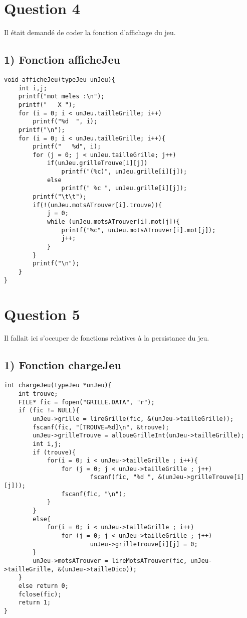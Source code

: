 \documentclass[a4paper,11pt]{article}
\begin{document}
\section*{Question 4}

Il était demandé de coder la fonction d'affichage du jeu.

\subsection*{1) Fonction afficheJeu}
\begin{lstlisting}[caption=La fonction afficheJeu]
void afficheJeu(typeJeu unJeu){
	int i,j;
	printf("mot meles :\n");
	printf("   X ");
	for (i = 0; i < unJeu.tailleGrille; i++)
		printf("%d  ", i);
	printf("\n");
	for (i = 0; i < unJeu.tailleGrille; i++){
		printf("   %d", i);
		for (j = 0; j < unJeu.tailleGrille; j++)
			if(unJeu.grilleTrouve[i][j])
				printf("(%c)", unJeu.grille[i][j]);
			else
				printf(" %c ", unJeu.grille[i][j]);
		printf("\t\t");
		if(!(unJeu.motsATrouver[i].trouve)){
			j = 0;
			while (unJeu.motsATrouver[i].mot[j]){
				printf("%c", unJeu.motsATrouver[i].mot[j]);
				j++;
			}
		}
		printf("\n");
	}
}
\end{lstlisting}

\section*{Question 5}

Il fallait ici s'occuper de fonctions relatives à la persistance du jeu.

\subsection*{1) Fonction chargeJeu}
\begin{lstlisting}[caption=La fonction chargeJeu]
int chargeJeu(typeJeu *unJeu){
	int trouve;
	FILE* fic = fopen("GRILLE.DATA", "r");
	if (fic != NULL){
		unJeu->grille = lireGrille(fic, &(unJeu->tailleGrille));
		fscanf(fic, "[TROUVE=%d]\n", &trouve);
		unJeu->grilleTrouve = alloueGrilleInt(unJeu->tailleGrille);
		int i,j;
		if (trouve){
			for(i = 0; i < unJeu->tailleGrille ; i++){
				for (j = 0; j < unJeu->tailleGrille ; j++)
						fscanf(fic, "%d ", &(unJeu->grilleTrouve[i][j]));
				fscanf(fic, "\n");
			}
		}
		else{
			for(i = 0; i < unJeu->tailleGrille ; i++)
				for (j = 0; j < unJeu->tailleGrille ; j++)
						unJeu->grilleTrouve[i][j] = 0;
		}
		unJeu->motsATrouver = lireMotsATrouver(fic, unJeu->tailleGrille, &(unJeu->tailleDico));
	}
	else return 0;
	fclose(fic);
	return 1;
}
\end{lstlisting}
\end{document}
